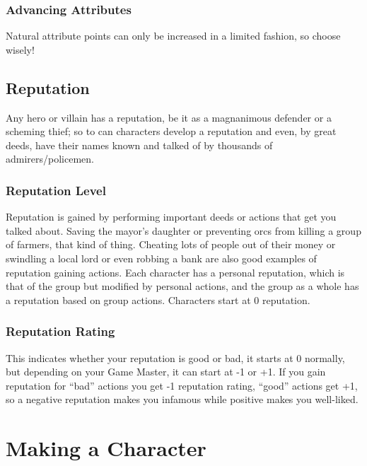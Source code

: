 \documentclass[a4paper,10pt,oneside]{book}
\begin{document}
\subsection{Advancing Attributes}
Natural attribute points can only be increased in a limited fashion, so choose wisely!



\section{Reputation}
Any hero or villain has a reputation, be it as a magnanimous defender or a scheming thief; so to can characters develop a reputation and even, by great deeds, have their names known and talked of by thousands of admirers/policemen. 

\subsection{Reputation Level}
Reputation is gained by performing important deeds or actions that get you talked about. Saving the mayor's daughter or preventing orcs from killing a group of farmers, that kind of thing. Cheating lots of people out of their money or swindling a local lord or even robbing a bank are also good examples of reputation gaining actions.
Each character has a personal reputation, which is that of the group but modified by personal actions, and the group as a whole has a reputation based on group actions.
Characters start at 0 reputation.

\subsection{Reputation Rating}
This indicates whether your reputation is good or bad, it starts at 0 normally, but depending on your Game Master, it can start at -1 or +1. If you gain reputation for ``bad'' actions you get -1 reputation rating, ``good'' actions get +1, so a negative reputation makes you infamous while positive makes you well-liked.





\chapter{Making a Character}
\end{document}
